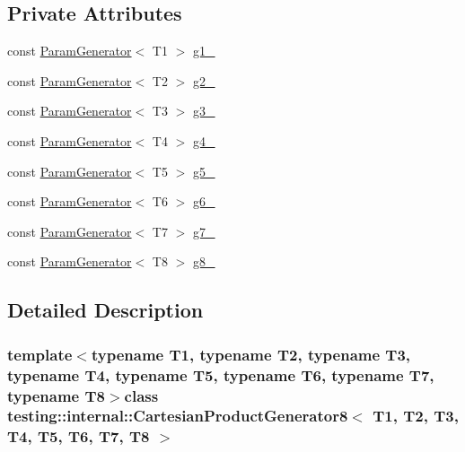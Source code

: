 \subsection*{\-Private \-Attributes}
\begin{DoxyCompactItemize}
\item 
const \hyperlink{classtesting_1_1internal_1_1ParamGenerator}{\-Param\-Generator}$<$ \-T1 $>$ \hyperlink{classtesting_1_1internal_1_1CartesianProductGenerator8_a315f81360fc67b016cbf514cb78c1975}{g1\-\_\-}
\item 
const \hyperlink{classtesting_1_1internal_1_1ParamGenerator}{\-Param\-Generator}$<$ \-T2 $>$ \hyperlink{classtesting_1_1internal_1_1CartesianProductGenerator8_a4bd40d1fbb8c6d2895b5201e62afbe38}{g2\-\_\-}
\item 
const \hyperlink{classtesting_1_1internal_1_1ParamGenerator}{\-Param\-Generator}$<$ \-T3 $>$ \hyperlink{classtesting_1_1internal_1_1CartesianProductGenerator8_acda98d4bf8f619856fb2e0ec015b9bc8}{g3\-\_\-}
\item 
const \hyperlink{classtesting_1_1internal_1_1ParamGenerator}{\-Param\-Generator}$<$ \-T4 $>$ \hyperlink{classtesting_1_1internal_1_1CartesianProductGenerator8_a1b3cef374aa9be9fbd4ed12caa7db9b5}{g4\-\_\-}
\item 
const \hyperlink{classtesting_1_1internal_1_1ParamGenerator}{\-Param\-Generator}$<$ \-T5 $>$ \hyperlink{classtesting_1_1internal_1_1CartesianProductGenerator8_a938d8dc16afe9878a43d89ce3cd87ad7}{g5\-\_\-}
\item 
const \hyperlink{classtesting_1_1internal_1_1ParamGenerator}{\-Param\-Generator}$<$ \-T6 $>$ \hyperlink{classtesting_1_1internal_1_1CartesianProductGenerator8_a905585e5d7722194673d92d7a29a2996}{g6\-\_\-}
\item 
const \hyperlink{classtesting_1_1internal_1_1ParamGenerator}{\-Param\-Generator}$<$ \-T7 $>$ \hyperlink{classtesting_1_1internal_1_1CartesianProductGenerator8_a55039ea79deff09f686dc351506af769}{g7\-\_\-}
\item 
const \hyperlink{classtesting_1_1internal_1_1ParamGenerator}{\-Param\-Generator}$<$ \-T8 $>$ \hyperlink{classtesting_1_1internal_1_1CartesianProductGenerator8_afbac9ea419b43f592302c2d32cc25209}{g8\-\_\-}
\end{DoxyCompactItemize}


\subsection{\-Detailed \-Description}
\subsubsection*{template$<$typename T1, typename T2, typename T3, typename T4, typename T5, typename T6, typename T7, typename T8$>$class testing\-::internal\-::\-Cartesian\-Product\-Generator8$<$ T1, T2, T3, T4, T5, T6, T7, T8 $>$}



